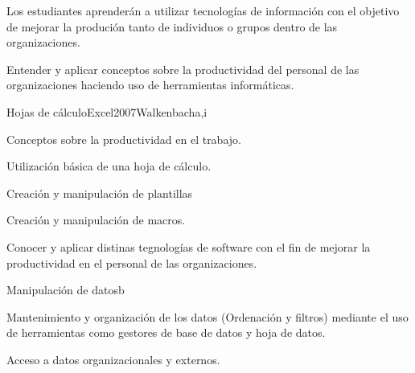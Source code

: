 \begin{syllabus}


\begin{justification}
Los estudiantes aprenderán a utilizar tecnologías de información con el objetivo de mejorar
la produción tanto de individuos o grupos dentro de las organizaciones.
\end{justification}

\begin{goals}
\item Entender y aplicar conceptos  sobre la productividad del personal de las organizaciones haciendo uso de herramientas informáticas.
\end{goals}

\begin{outcomes}
\end{outcomes}

\begin{unit}{Hojas de cálculo}{Excel2007Walkenbach}{a,i}
   \begin{topics}
      \item Conceptos sobre la productividad en el trabajo.
      \item Utilización básica de una hoja de cálculo.
      \item Creación y manipulación de plantillas
      \item Creación y manipulación de macros.
   \end{topics}

   \begin{unitgoals}
      \item Conocer y aplicar distinas  tegnologías  de software con el fin de mejorar la productividad en el personal de las organizaciones.
   \end{unitgoals}
\end{unit}

\begin{unit}{Manipulación de datos}{}{b}
   \begin{topics}
      \item Mantenimiento y organización de los datos (Ordenación y filtros) mediante el uso de herramientas como gestores de base de datos y hoja de datos.
      \item Acceso a datos organizacionales y externos.
   \end{topics}


\end{unit}
\end{syllabus}
